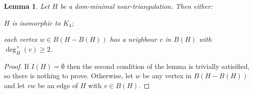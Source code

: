\documentclass{article}
\newtheorem{lem}{Lemma}
\theoremstyle{definition}
\begin{document}
\begin{lem}\label{degree_2_outer_neighbour}
  Let $H$ be a dom-minimal near-triangulation. Then either:
  \begin{compactenum}
    \item $H$ is isomorphic to $K_4$;
    \item each vertex $w\in B(H-B(H))$ has a neighbour $v$ in $B(H)$ with $\deg^+_H(v)\ge 2$.
  \end{compactenum}
\end{lem}

\begin{proof}
  If $I(H)=\emptyset$ then the second condition of the lemma is trivially satisified, so there is nothing to prove. Otherwise, let $w$ be any vertex in $B(H-B(H))$ and let $vw$ be an edge of $H$ with $v\in B(H)$.



\end{proof}
\end{document}
